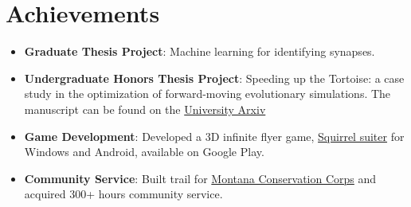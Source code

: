 \documentclass[letterpaper,9pt]{article}
\newcommand{\resumeNoWrapItem}[2]{
  \item\small{
    \textbf{#1}{: #2 \vspace{-2pt}}
  }
}
\newcommand{\resumeSubItem}[2]{\resumeNoWrapItem{#1}{#2}\vspace{-2pt}}
\newcommand{\resumeSubHeadingListStart}{\begin{itemize}[leftmargin=*]}
\newcommand{\resumeSubHeadingListEnd}{\end{itemize}}
\begin{document}
\section{Achievements}

\resumeSubHeadingListStart
    \resumeSubItem{Graduate Thesis Project}
    {
        Machine learning for identifying synapses.
    }
    \resumeSubItem{Undergraduate Honors Thesis Project}
    {
        Speeding up the Tortoise: a case study in the optimization of forward-moving evolutionary simulations.
        The manuscript can be found on the 
        \href{https://www.cs.uoregon.edu/Reports/UG-201806-Galloway.pdf}{University Arxiv}
    }
    \resumeSubItem{Game Development}
    {
        Developed a 3D infinite flyer game,
        \href{https://play.google.com/store/apps/details?id=com.Nighthawks.SquirrelSuiter&hl=en_US}{Squirrel suiter} 
        for Windows and Android, available on Google Play.
    }
    \resumeSubItem{Community Service}
    {
        Built trail for 
        \href{https://www.mtcorps.org/joinmcc/open-positions/?gclid=CjwKCAiAkp6tBhB5EiwANTCx1LErxt8iVHJUsmKRme2uhYbYdg1lW3F5nl2XQ3P7Wp9yzlKZ-Uv1oxoCPSQQAvD_BwE}{Montana Conservation Corps} 
        and acquired 300+
        hours community service.
    }

\resumeSubHeadingListEnd
\end{document}
